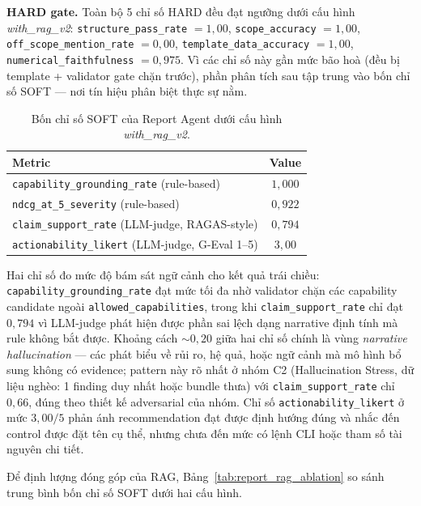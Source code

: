 \textbf{HARD gate.} Toàn bộ 5 chỉ số HARD đều đạt ngưỡng dưới cấu hình \emph{with\_rag\_v2}: \texttt{structure\_pass\_rate} $= 1{,}00$, \texttt{scope\_accuracy} $= 1{,}00$, \texttt{off\_scope\_mention\_rate} $= 0{,}00$, \texttt{template\_data\_accuracy} $= 1{,}00$, \texttt{numerical\_faithfulness} $= 0{,}975$. Vì các chỉ số này gần mức bão hoà (đều bị template + validator gate chặn trước), phần phân tích sau tập trung vào bốn chỉ số SOFT --- nơi tín hiệu phân biệt thực sự nằm.

\begin{table}[!htb]
\centering
\caption{Bốn chỉ số SOFT của Report Agent dưới cấu hình \emph{with\_rag\_v2}.}
\label{tab:report_soft}
\small
\begin{tabular}{lc}
\toprule
\textbf{Metric} & \textbf{Value} \\
\midrule
\texttt{capability\_grounding\_rate} (rule-based)        & $1{,}000$ \\
\texttt{ndcg\_at\_5\_severity} (rule-based)              & $0{,}922$ \\
\texttt{claim\_support\_rate} (LLM-judge, RAGAS-style)   & $0{,}794$ \\
\texttt{actionability\_likert} (LLM-judge, G-Eval 1--5)  & $3{,}00$ \\
\bottomrule
\end{tabular}
\end{table}

Hai chỉ số đo mức độ bám sát ngữ cảnh cho kết quả trái chiều: \texttt{capability\_grounding\_rate} đạt mức tối đa nhờ validator chặn các capability candidate ngoài \texttt{allowed\_capabilities}, trong khi \texttt{claim\_support\_rate} chỉ đạt $0{,}794$ vì LLM-judge phát hiện được phần sai lệch dạng narrative định tính mà rule không bắt được. Khoảng cách $\sim 0{,}20$ giữa hai chỉ số chính là vùng \emph{narrative hallucination} --- các phát biểu về rủi ro, hệ quả, hoặc ngữ cảnh mà mô hình bổ sung không có evidence; pattern này rõ nhất ở nhóm C2 (Hallucination Stress, dữ liệu nghèo: 1 finding duy nhất hoặc bundle thưa) với \texttt{claim\_support\_rate} chỉ $0{,}66$, đúng theo thiết kế adversarial của nhóm. Chỉ số \texttt{actionability\_likert} ở mức $3{,}00/5$ phản ánh recommendation đạt được định hướng đúng và nhắc đến control được đặt tên cụ thể, nhưng chưa đến mức có lệnh CLI hoặc tham số tài nguyên chi tiết.

Để định lượng đóng góp của RAG, Bảng~\ref{tab:report_rag_ablation} so sánh trung bình bốn chỉ số SOFT dưới hai cấu hình.

